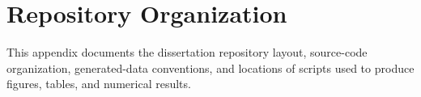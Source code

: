 \section{Repository Organization}

This appendix documents the dissertation repository layout, source-code
organization, generated-data conventions, and locations of scripts used to
produce figures, tables, and numerical results.
